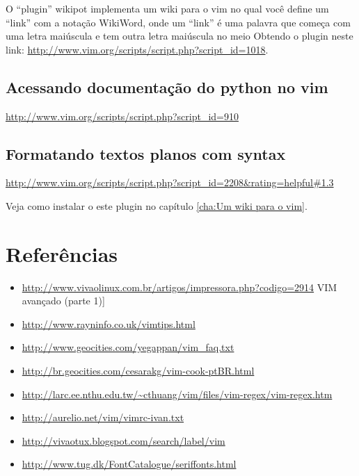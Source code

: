 \documentclass[10pt,a4paper,openany]{book}
\begin{document}
O ``plugin'' wikipot implementa um wiki para o vim no qual você define
um ``link'' com a notação WikiWord, onde um ``link'' é uma palavra que
começa com uma letra maiúscula e tem outra letra maiúscula no meio
Obtendo o plugin neste link: \url{http://www.vim.org/scripts/script.php?script\_id=1018}.

\section{Acessando documentação do python no vim}\label{Acessando documentação do python no vim}

 \url{http://www.vim.org/scripts/script.php?script\_id=910}

\section{Formatando textos planos com syntax}
\label{Formatando textos planos com syntax}
\url{http://www.vim.org/scripts/script.php?script\_id=2208&rating=helpful#1.3}

Veja como instalar o este plugin no capítulo \ref{cha:Um wiki para o vim}.

\chapter{Referências}
\begin{itemize}
\item \url{http://www.vivaolinux.com.br/artigos/impressora.php?codigo=2914} VIM avançado (parte 1)]
\item \url{http://www.rayninfo.co.uk/vimtips.html}
\item \url{http://www.geocities.com/yegappan/vim\_faq.txt}
\item \url{http://br.geocities.com/cesarakg/vim-cook-ptBR.html}
\item \url{http://larc.ee.nthu.edu.tw/~cthuang/vim/files/vim-regex/vim-regex.htm}
\item \url{http://aurelio.net/vim/vimrc-ivan.txt}
\item \url{http://vivaotux.blogspot.com/search/label/vim}
\item \url{http://www.tug.dk/FontCatalogue/seriffonts.html}
\end{itemize}
\end{document}

